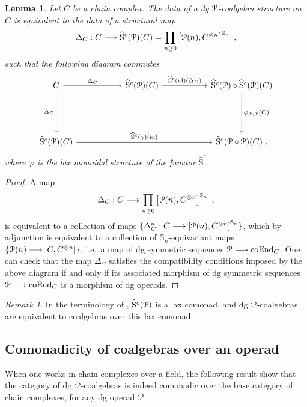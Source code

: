 \documentclass{proc-l}
\renewcommand{\mathcal}{\EuScript}
\newcommand{\oneop}{\mathcal{P}}
\theoremstyle{plain}
\newtheorem{lemma}[{theorem}]{Lemma}
\theoremstyle{definition}
\theoremstyle{remark}
\newtheorem{remark}[{theorem}]{Remark}
\begin{document}
\begin{lemma}%
\label{Lemma:2.8}\label{definition: P-coalgebra}
Let $C$ be a chain complex. The data of a dg $\oneop$-coalgebra structure on $C$ is equivalent to the data of a  structural map
\[
\Delta_C: C \longrightarrow \widehat{\mathrm{S}}^c(\oneop)(C)  = \displaystyle \prod_{n \geq 0} \left[\mathcal{P}(n),C^{\otimes n}\right]^{\mathbb{S}_n}~,
\]
such that the following diagram commutes
\[
\begin{tikzcd}[column sep=4.5pc,row sep=4pc]
C \arrow[r,"\Delta_C"] \arrow[d,"\Delta_C",swap]
&\widehat{\mathrm{S}}^c(\oneop)(C) \arrow[r,"\widehat{\mathrm{S}}^c(\mathrm{id})(\Delta_C)"]
&\widehat{\mathrm{S}}^c(\oneop) \circ \widehat{\mathrm{S}}^c(\oneop)(C) \arrow[d,"\varphi_{\oneop,\oneop}(C)"] \\
\widehat{\mathrm{S}}^c(\oneop)(C) \arrow[rr,"\widehat{\mathrm{S}}^c(\gamma)(\mathrm{id})"]
&
&\widehat{\mathrm{S}}^c(\oneop \circ \oneop)(C)~,
\end{tikzcd}
\]
where $\varphi$ is the lax monoidal structure of the functor $\widehat{\mathrm{S}}^c$.
\end{lemma}

\begin{proof}
A map
\[
\Delta_C: C \longrightarrow \displaystyle \prod_{n \geq 0} \left[\mathcal{P}(n),C^{\otimes n}\right]^{\mathbb{S}_n}~,
\]
is equivalent to a collection of maps $\{\Delta_C^n: C \longrightarrow \left[\mathcal{P}(n),C^{\otimes n}\right]^{\mathbb{S}_n}\}$, which by adjunction is equivalent to a collection of $\mathbb S_n$-equivariant maps $\{\mathcal{P}(n) \longrightarrow \left[C,C^{\otimes n}\right]\}$, i.e.\ a map of dg symmetric sequences $\mathcal{P} \longrightarrow \mathrm{coEnd}_C$. One can check that the map $\Delta_C$ satisfies the compatibility conditions imposed by the above diagram if and only if its associated morphism of dg symmetric sequences $\mathcal{P} \longrightarrow \mathrm{coEnd}_C$ is a morphism of dg operads.
\end{proof}

\begin{remark}%
\label{Remark:2.9}In the terminology of \cite{anelcofree2014}, $\widehat{\mathrm{S}}^c(\oneop)$ is a lax comonad, and dg $\oneop$-coalgebras are equivalent to coalgebras over this lax comonad.
\end{remark}

\subsection{Comonadicity of coalgebras over an operad}%
\label{Section:2.3}
When one works in chain complexes over a field, the following result show that the category of dg $\mathcal{P}$-coalgebras is indeed comonadic over the base category of chain complexes, for any dg operad $\mathcal{P}$.
\end{document}
